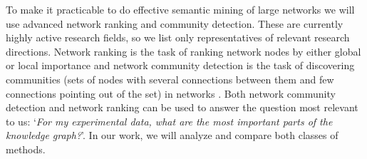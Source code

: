 \documentclass[a4paper,11pt]{article}
\begin{document}
To make it practicable to do effective semantic mining of large networks we will use advanced network ranking and community detection. These are currently highly active research fields, so we list only representatives of relevant research directions. Network ranking is the task of ranking network nodes by either global or local importance \citep{Le2015} and network community detection is the task of discovering communities (sets of nodes with several connections between them and few connections pointing out of the set) in networks \citep{Shang2016}.
Both network community detection and network ranking can be used to answer the question most relevant to us: `\textit{For my experimental data, what are the most important parts of the knowledge graph?}'. In our work, we will analyze and compare both classes of methods.
%
\end{document}

